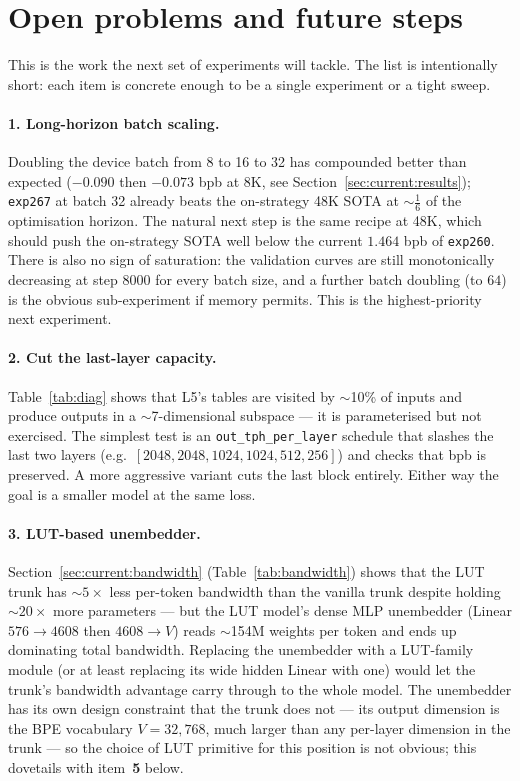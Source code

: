 \documentclass[11pt]{article}
\begin{document}
\section{Open problems and future steps}
\label{sec:future}

This is the work the next set of experiments will tackle.
The list is intentionally short: each item is concrete enough to be a single experiment or a tight sweep.

\paragraph{1. Long-horizon batch scaling.}
Doubling the device batch from 8 to 16 to 32 has compounded better than expected ($-0.090$ then $-0.073$ bpb at 8K, see Section~\ref{sec:current:results}); \texttt{exp267} at batch 32 already beats the on-strategy 48K SOTA at $\sim$$\frac{1}{6}$ of the optimisation horizon.
The natural next step is the same recipe at 48K, which should push the on-strategy SOTA well below the current $1.464$ bpb of \texttt{exp260}.
There is also no sign of saturation: the validation curves are still monotonically decreasing at step 8000 for every batch size, and a further batch doubling (to $64$) is the obvious sub-experiment if memory permits.
This is the highest-priority next experiment.

\paragraph{2. Cut the last-layer capacity.}
Table~\ref{tab:diag} shows that L5's tables are visited by $\sim$10\% of inputs and produce outputs in a $\sim$7-dimensional subspace --- it is parameterised but not exercised.
The simplest test is an \texttt{out\_tph\_per\_layer} schedule that slashes the last two layers (e.g.\ $[2048, 2048, 1024, 1024, 512, 256]$) and checks that bpb is preserved.
A more aggressive variant cuts the last block entirely.
Either way the goal is a smaller model at the same loss.

\paragraph{3. LUT-based unembedder.}
Section~\ref{sec:current:bandwidth} (Table~\ref{tab:bandwidth}) shows that the LUT trunk has $\sim$$5\times$ less per-token bandwidth than the vanilla trunk despite holding $\sim$$20\times$ more parameters --- but the LUT model's dense MLP unembedder (Linear $576 \to 4608$ then $4608 \to V$) reads $\sim$154M weights per token and ends up dominating total bandwidth.
Replacing the unembedder with a LUT-family module (or at least replacing its wide hidden Linear with one) would let the trunk's bandwidth advantage carry through to the whole model.
The unembedder has its own design constraint that the trunk does not --- its output dimension is the BPE vocabulary $V = 32{,}768$, much larger than any per-layer dimension in the trunk --- so the choice of LUT primitive for this position is not obvious; this dovetails with item~\textbf{5} below.
\end{document}
